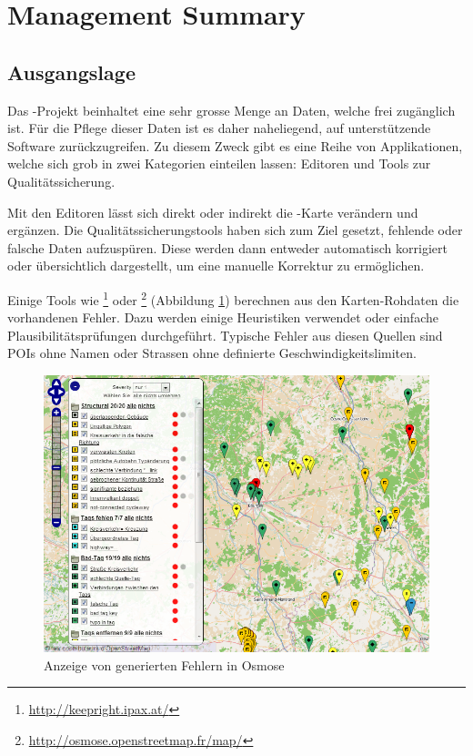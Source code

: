 \chapter*{Management Summary}
\thispagestyle{scrheadings}

\section*{Ausgangslage}
Das -Projekt beinhaltet eine sehr grosse Menge an Daten, welche frei zugänglich ist.
Für die Pflege dieser Daten ist es daher naheliegend, auf unterstützende Software zurückzugreifen.
Zu diesem Zweck gibt es eine Reihe von Applikationen, welche sich grob in zwei Kategorien einteilen lassen:
Editoren und Tools zur Qualitätssicherung.

Mit den Editoren lässt sich direkt oder indirekt die -Karte verändern und ergänzen.
Die Qualitätssicherungstools haben sich zum Ziel gesetzt, fehlende oder falsche Daten aufzuspüren.
Diese werden dann entweder automatisch korrigiert oder übersichtlich dargestellt, um eine manuelle Korrektur zu ermöglichen.

Einige Tools wie \footnote{\url{http://keepright.ipax.at/}} oder \footnote{\url{http://osmose.openstreetmap.fr/map/}} (Abbildung \ref{image-osmose-screenshot}) berechnen aus den Karten-Rohdaten die vorhandenen Fehler.
Dazu werden einige Heuristiken verwendet oder einfache Plausibilitätsprüfungen durchgeführt.
Typische Fehler aus diesen Quellen sind \glspl{POI} ohne Namen oder Strassen ohne definierte Geschwindigkeitslimiten.

\begin{figure}[H]
	\centering
	\includegraphics[scale=0.4]{images/managementsummary/osmose-screenshot}
	\caption{Anzeige von generierten Fehlern in Osmose}
	\label{image-osmose-screenshot}
\end{figure}

